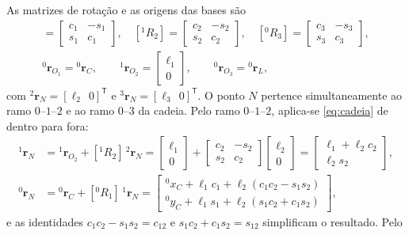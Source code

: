 \documentclass[12pt,a4paper,twoside]{article}
\newcommand{\rv}[2]{{}^{#1}\mathbf{r}_{#2}}          %
\newcommand{\Rm}[2]{[{}^{#1}R_{#2}]}                 %
\numberwithin{equation}{section}
\begin{document}
As matrizes de rotação e as origens das bases são
\begin{gather}
  \Rm{0}{1} = \begin{bmatrix} c_1 & -s_1 \\ s_1 & c_1 \end{bmatrix},\quad
  \Rm{1}{2} = \begin{bmatrix} c_2 & -s_2 \\ s_2 & c_2 \end{bmatrix},\quad
  \Rm{0}{3} = \begin{bmatrix} c_3 & -s_3 \\ s_3 & c_3 \end{bmatrix},\\
  \rv{0}{O_1} = \rv{0}{C},\qquad \rv{1}{O_2} = \begin{bmatrix} \ell_1 \\ 0 \end{bmatrix},\qquad \rv{0}{O_3} = \rv{0}{L},
\end{gather}
com $\rv{2}{N} = [\ell_2\ \ 0]^{\mathsf T}$ e $\rv{3}{N} = [\ell_3\ \ 0]^{\mathsf T}$. O ponto $N$ pertence
simultaneamente ao ramo $0\text{--}1\text{--}2$ e ao ramo $0\text{--}3$ da cadeia. Pelo ramo
$0\text{--}1\text{--}2$, aplica-se \eqref{eq:cadeia} de dentro para fora:
\begin{align*}
  \rv{1}{N} &= \rv{1}{O_2} + \Rm{1}{2}\,\rv{2}{N}
            = \begin{bmatrix} \ell_1 \\ 0 \end{bmatrix} + \begin{bmatrix} c_2 & -s_2 \\ s_2 & c_2 \end{bmatrix}\begin{bmatrix} \ell_2 \\ 0 \end{bmatrix}
            = \begin{bmatrix} \ell_1 + \ell_2 c_2 \\ \ell_2 s_2 \end{bmatrix},\\
  \rv{0}{N} &= \rv{0}{C} + \Rm{0}{1}\,\rv{1}{N}
            = \begin{bmatrix} {}^0x_C + \ell_1 c_1 + \ell_2(c_1c_2 - s_1s_2) \\ {}^0y_C + \ell_1 s_1 + \ell_2(s_1c_2 + c_1s_2) \end{bmatrix},
\end{align*}
e as identidades $c_1c_2 - s_1s_2 = c_{12}$ e $s_1c_2 + c_1s_2 = s_{12}$ simplificam o resultado. Pelo
\end{document}
